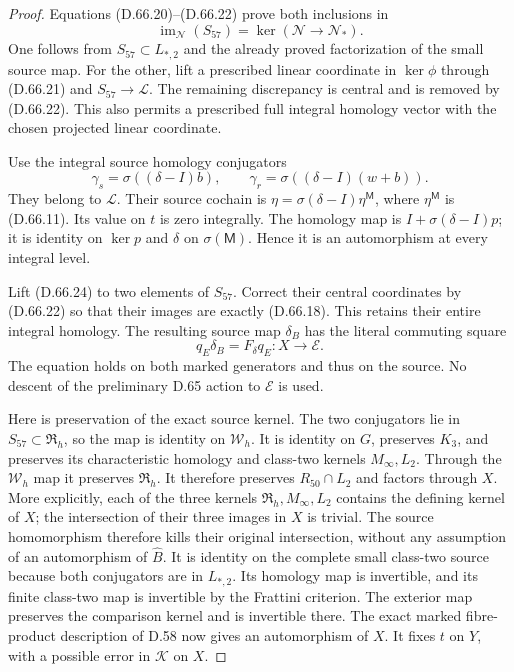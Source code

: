 \begin{proof}
Equations (D.66.20)--(D.66.22) prove both inclusions
in
\[
        \operatorname{im}_{\mathscr N}(S_{57})
                      =\ker(\mathscr N\to\mathscr N_*).
 \tag{D.66.23}
\]
One follows from \(S_{57}\subset L_{*,2}\) and
the already proved factorization of the small
source map. For the other, lift a prescribed
linear coordinate in \(\ker\phi\) through
(D.66.21) and \(S_{57}\to\mathcal L\).
The remaining discrepancy is central and is
removed by (D.66.22). This also permits a
prescribed full integral homology vector with
the chosen projected linear coordinate.

Use the integral source homology conjugators
\[
 \gamma_s=\sigma((\delta-I)b),\qquad
 \gamma_r=\sigma((\delta-I)(w+b)).
 \tag{D.66.24}
\]
They belong to \(\mathcal L\). Their source
cochain is
\(\eta=\sigma(\delta-I)\eta^{\mathsf M}\),
where \(\eta^{\mathsf M}\) is (D.66.11).
Its value on \(t\) is zero integrally. The
homology map is \(I+\sigma(\delta-I)p\);
it is identity on \(\ker p\) and \(\delta\)
on \(\sigma(\mathsf M)\). Hence it is an
automorphism at every integral level.

Lift (D.66.24) to two elements of \(S_{57}\).
Correct their central coordinates by (D.66.22)
so that their images are exactly (D.66.18).
This retains their entire integral homology.
The resulting source map \(\delta_B\) has
the literal commuting square
\[
             q_E\delta_B=F_\delta q_E:
                              X\longrightarrow\mathscr E.
 \tag{D.66.25}
\]
The equation holds on both marked generators
and thus on the source. No descent of the
preliminary D.65 action to \(\mathscr E\)
is used.

Here is preservation of the exact source
kernel. The two conjugators lie in
\(S_{57}\subset\mathfrak R_h\), so the map
is identity on \(\mathcal W_h\). It is
identity on \(G\), preserves \(K_3\), and
preserves its characteristic homology and
class-two kernels \(M_\infty,L_2\). Through
the \(\mathcal W_h\) map it preserves
\(\mathfrak R_h\). It therefore preserves
\(R_{50}\cap L_2\) and factors through \(X\).
More explicitly, each of the three kernels
\(\mathfrak R_h,M_\infty,L_2\) contains
the defining kernel of \(X\); the intersection
of their three images in \(X\) is trivial.
The source homomorphism therefore kills
their original intersection, without any
assumption of an automorphism of \(\widehat B\).
It is identity on the complete small class-two
source because both conjugators are in
\(L_{*,2}\). Its homology map is invertible,
and its finite class-two map is invertible by
the Frattini criterion. The exterior map
preserves the comparison kernel and is
invertible there. The exact marked
fibre-product description of D.58 now gives
an automorphism of \(X\). It fixes \(t\)
on \(Y\), with a possible error in
\(\mathcal K\) on \(X\).


\end{proof}
